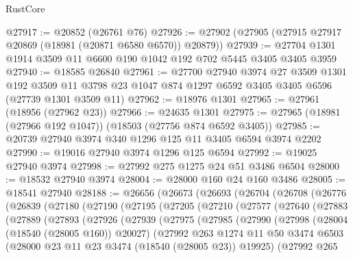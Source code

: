 \begin{lexlean}{RustCore}
\begin{coremodule}
@27917 := @20852 (@26761 @76)
@27926 := @27902 (@27905 (@27915 @27917 @20869 (@18981 (@20871 @6580 @6570)) @20879))
@27939 := @27704 @1301 @1914 @3509 @11 @6600 @190 @1042 @192 @702 @5445 @3405 @3405 @3959
@27940 := @18585 @26840
@27961 := @27700
    @27940
    @3974
    @27
    @3509
    @1301
    @192
    @3509
    @11
    @3798
    @23
    @1047
    @874
    @1297
    @6592
    @3405
    @3405
    @6596
    (@27739 @1301 @3509 @11)
@27962 := @18976 @1301
@27965 := @27961 (@18956 (@27962 @23))
@27966 := @24635 @1301
@27975 := @27965 (@18981 (@27966 @192 @1047)) (@18503 (@27756 @874 @6592 @3405))
@27985 := @20739 @27940 @3974 @340 @1296 @125 @11 @3405 @6594 @3974 @2202
@27990 := @19016 @27940 @3974 @1296 @125 @6594
@27992 := @19025 @27940 @3974
@27998 := @27992 @275 @1275 @24 @51 @3486 @6504
@28000 := @18532 @27940 @3974
@28004 := @28000 @160 @24 @160 @3486
@28005 := @18541 @27940
@28188 := @26656
    (@26673
      (@26693
        (@26704
          (@26708
            (@26776
              (@26839
                (@27180
                  (@27190
                    (@27195
                      (@27205
                        (@27210
                          (@27577
                            (@27640
                              (@27883
                                (@27889
                                  (@27893
                                    (@27926
                                      (@27939
                                        (@27975
                                          (@27985
                                            (@27990
                                              (@27998
                                                (@28004 (@18540 (@28005 @160)) @20027)
                                                (@27992
                                                  @263
                                                  @1274
                                                  @11
                                                  @50
                                                  @3474
                                                  @6503
                                                  (@28000
                                                    @23
                                                    @11
                                                    @23
                                                    @3474
                                                    (@18540 (@28005 @23))
                                                    @19925)
                                                  (@27992
                                                    @265

\end{coremodule}
\end{lexlean}
